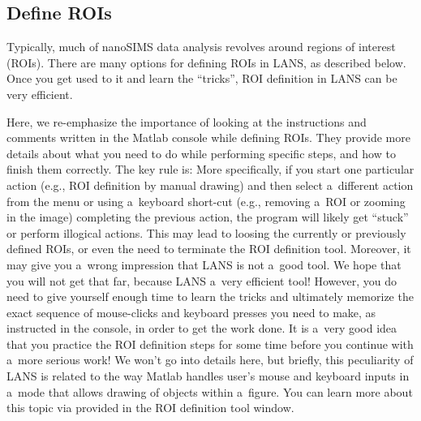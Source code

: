 \subsection{Define ROIs}
\label{sec:defineROIs}
\setcounter{step}{0}

\goldbox{}
Typically, much of nanoSIMS data analysis revolves around regions of interest (ROIs). There are many options for defining ROIs in LANS, as described below. Once you get used to it and learn the ``tricks'', ROI definition in LANS can be very efficient. 
\tcbe

Here, we re-emphasize the importance of looking at the instructions and comments written in the Matlab console while defining ROIs. They provide more details about what  you need to do while performing specific steps, and how to finish them correctly. The key rule is: \textcolor{red}{} More specifically, if you start one particular action (e.g., ROI definition by manual drawing) and then select a~different action from the menu or using a~keyboard short-cut (e.g., removing a~ROI or zooming in the image)  completing the previous action, the program will likely get ``stuck'' or perform illogical actions. This may lead to loosing the currently or previously defined ROIs, or even the need to terminate the ROI definition tool. Moreover, it may give you a~wrong impression that LANS is not a~good tool. We hope that you will not get that far, because LANS  a~very efficient tool! However, you do need to give yourself enough time to learn the tricks and ultimately memorize the exact sequence of mouse-clicks and keyboard presses you need to make, as instructed in the console, in order to get the work done. It is a~very good idea that you practice the ROI definition steps for some time before you continue with a~more serious work!  We won't go into details here, but briefly, this peculiarity of LANS is related to the way Matlab handles user's mouse and keyboard inputs in a~mode that allows drawing of objects within a~figure. You can learn more about this topic via  provided in the ROI definition tool window.
\tcbe




